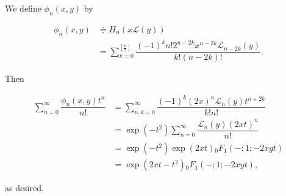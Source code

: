 \begin{solution}
We define $\phi_n(x,y)$ by

$$\begin{array}{ll}
\phi_n(x,y) &\doteqdot H_n(x\mathscr{L}(y)) \\
&= \displaystyle\sum_{k=0}^{[\frac{n}{2}]} \dfrac{(-1)^k n! 2^{n-2k} x^{n-2k} \mathscr{L}_{n-2k}(y)}{k! (n-2k)!}.
\end{array}$$

Then

$$\begin{array}{ll}
\displaystyle\sum_{n=0}^{\infty} \dfrac{\phi_n(x,y)t^n}{n!} &= \displaystyle\sum_{n,k=0}^{\infty} \dfrac{(-1)^k (2x)^n \mathscr{L}_n(y) t^{n+2k}}{k!n!} \\
&= \exp(-t^2) \displaystyle\sum_{n=0}^{\infty} \dfrac{\mathscr{L}_n(y) (2xt)^n}{n!} \\
&= \exp(-t^2) \exp(2xt) {}_0F_1(-;1;-2xgt) \\
&= \exp(2xt-t^2) {}_0F_1(-;1;-2xyt),
\end{array}$$

as desired.
\end{solution}